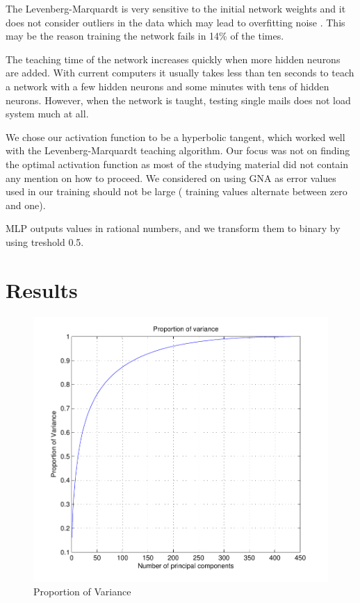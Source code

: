 The Levenberg-Marquardt is very sensitive to the initial network weights and it does not consider outliers in the data which may lead to overfitting noise  \cite{crsouza} . This may be the reason training the network fails in 14\% of the times.

The teaching time of the network increases quickly when more hidden neurons are added. With current computers it usually takes less than ten seconds to teach a network with a few hidden neurons and some minutes with tens of hidden neurons. However, when the network is taught, testing single mails does not load system much at all.

We chose our activation function to be a hyperbolic tangent, which worked well with the Levenberg-Marquardt teaching algorithm. Our focus was not on finding the optimal activation function as most of the studying material did not contain any mention on how to proceed. We considered on using GNA as error values used in our training should not be large ( training values alternate between zero and one).

MLP outputs values in rational numbers, and we transform them to binary by using treshold 0.5.

\section{Results}
\label{sec:results}

\begin{figure}[h]
  \centering
  \includegraphics{pov}
  \caption{Proportion of Variance}
\end{figure}

